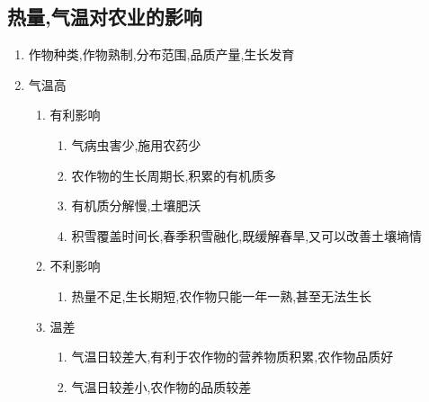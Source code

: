 \documentclass[a4paper]{article}
\begin{document}
    \subsection{热量,气温对农业的影响}
    \begin{enumerate}
        \item 作物种类,作物熟制,分布范围,品质产量,生长发育
        \item 气温高
        \begin{enumerate}
            \item 有利影响
            \begin{enumerate}
                \item 气病虫害少,施用农药少
                \item 农作物的生长周期长,积累的有机质多
                \item 有机质分解慢,土壤肥沃
                \item 积雪覆盖时间长,春季积雪融化,既缓解春旱,又可以改善土壤墒情
            \end{enumerate}
            \item 不利影响
            \begin{enumerate}
                \item 热量不足,生长期短,农作物只能一年一熟,甚至无法生长
            \end{enumerate}
            \item 温差
            \begin{enumerate}
                \item 气温日较差大,有利于农作物的营养物质积累,农作物品质好
                \item 气温日较差小,农作物的品质较差
            \end{enumerate}
        \end{enumerate}
    \end{enumerate}
\end{document}
